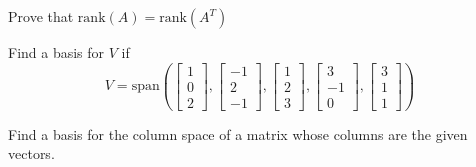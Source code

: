 \documentclass{ximera}
\begin{document}
\begin{problem}
Prove that $\mbox{rank}(A)=\mbox{rank}(A^T)$
\end{problem}

\begin{problem}
Find a basis for $V$ if 
$$V=\mbox{span}\left( \begin{bmatrix}1\\0\\2\end{bmatrix}, \begin{bmatrix}-1\\2\\-1\end{bmatrix}, \begin{bmatrix}1\\2\\3\end{bmatrix}, \begin{bmatrix}3\\-1\\0\end{bmatrix}, \begin{bmatrix}3\\1\\1\end{bmatrix}\right)$$
\begin{hint}
Find a basis for the column space of a matrix whose columns are the given vectors.
\end{hint}
\end{problem}
\end{document}
